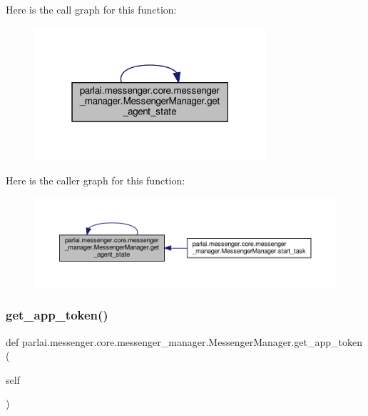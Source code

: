 Here is the call graph for this function\+:
\nopagebreak
\begin{figure}[H]
\begin{center}
\leavevmode
\includegraphics[width=244pt]{classparlai_1_1messenger_1_1core_1_1messenger__manager_1_1MessengerManager_aad51f1633f4d56d2a8812562f0608e03_cgraph}
\end{center}
\end{figure}
Here is the caller graph for this function\+:
\nopagebreak
\begin{figure}[H]
\begin{center}
\leavevmode
\includegraphics[width=350pt]{classparlai_1_1messenger_1_1core_1_1messenger__manager_1_1MessengerManager_aad51f1633f4d56d2a8812562f0608e03_icgraph}
\end{center}
\end{figure}
\mbox{\label{classparlai_1_1messenger_1_1core_1_1messenger__manager_1_1MessengerManager_a40189b28ba847731c4749cc6de05252c}} 
\subsubsection{\texorpdfstring{get\+\_\+app\+\_\+token()}{get\_app\_token()}}
{\footnotesize\ttfamily def parlai.\+messenger.\+core.\+messenger\+\_\+manager.\+Messenger\+Manager.\+get\+\_\+app\+\_\+token (\begin{DoxyParamCaption}\item[{}]{self }\end{DoxyParamCaption})}

